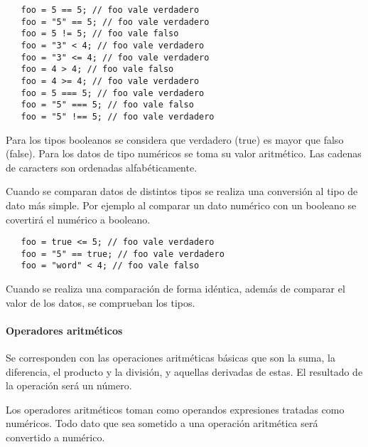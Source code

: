 \begin{lstlisting}
   foo = 5 == 5; // foo vale verdadero
   foo = "5" == 5; // foo vale verdadero
   foo = 5 != 5; // foo vale falso
   foo = "3" < 4; // foo vale verdadero
   foo = "3" <= 4; // foo vale verdadero
   foo = 4 > 4; // foo vale falso
   foo = 4 >= 4; // foo vale verdadero
   foo = 5 === 5; // foo vale verdadero
   foo = "5" === 5; // foo vale falso
   foo = "5" !== 5; // foo vale verdadero
\end{lstlisting} 

Para los tipos booleanos se considera que verdadero (true) es mayor que falso (false). Para los datos de tipo numéricos se toma su valor aritmético.
Las cadenas de caracters son ordenadas alfabéticamente.

Cuando se comparan datos de distintos tipos se realiza una conversión al tipo de dato más simple. Por ejemplo al comparar un dato numérico con un booleano se covertirá
el numérico a booleano. \\

\begin{lstlisting}
   foo = true <= 5; // foo vale verdadero
   foo = "5" == true; // foo vale verdadero
   foo = "word" < 4; // foo vale falso
\end{lstlisting} 

Cuando se realiza una comparación de forma idéntica, además de comparar el valor de los datos, se comprueban los tipos.



\paragraph{Operadores aritméticos} \label{sec:op_arth}

Se corresponden con las operaciones aritméticas básicas que son la suma, la diferencia, el producto y la división, y 
aquellas derivadas de estas. El resultado de la operación será un número.

Los operadores aritméticos toman como operandos expresiones tratadas como numéricos. Todo dato que sea sometido a una operación
aritmética será convertido a numérico.

